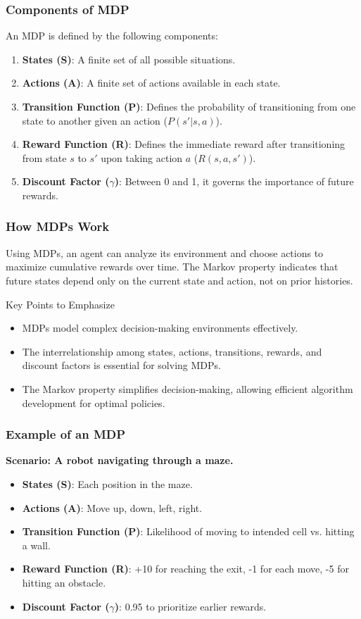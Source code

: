 \documentclass{beamer}
\begin{document}
\begin{frame}[fragile]
    \frametitle{Components of MDP}
    An MDP is defined by the following components:

    \begin{enumerate}
        \item \textbf{States (S)}: A finite set of all possible situations.
        \item \textbf{Actions (A)}: A finite set of actions available in each state.
        \item \textbf{Transition Function (P)}: Defines the probability of transitioning from one state to another given an action (\( P(s'|s, a) \)).
        \item \textbf{Reward Function (R)}: Defines the immediate reward after transitioning from state \( s \) to \( s' \) upon taking action \( a \) (\( R(s, a, s') \)).
        \item \textbf{Discount Factor ($\gamma$)}: Between 0 and 1, it governs the importance of future rewards.
    \end{enumerate}
\end{frame}

\begin{frame}[fragile]
    \frametitle{How MDPs Work}
    Using MDPs, an agent can analyze its environment and choose actions to maximize cumulative rewards over time. The Markov property indicates that future states depend only on the current state and action, not on prior histories.

    \begin{block}{Key Points to Emphasize}
        \begin{itemize}
            \item MDPs model complex decision-making environments effectively.
            \item The interrelationship among states, actions, transitions, rewards, and discount factors is essential for solving MDPs.
            \item The Markov property simplifies decision-making, allowing efficient algorithm development for optimal policies.
        \end{itemize}
    \end{block}
\end{frame}

\begin{frame}[fragile]
    \frametitle{Example of an MDP}
    \textbf{Scenario: A robot navigating through a maze.}
    \begin{itemize}
        \item \textbf{States (S)}: Each position in the maze.
        \item \textbf{Actions (A)}: Move up, down, left, right.
        \item \textbf{Transition Function (P)}: Likelihood of moving to intended cell vs. hitting a wall.
        \item \textbf{Reward Function (R)}: +10 for reaching the exit, -1 for each move, -5 for hitting an obstacle.
        \item \textbf{Discount Factor ($\gamma$)}: 0.95 to prioritize earlier rewards.
    \end{itemize}
\end{frame}
\end{document}
